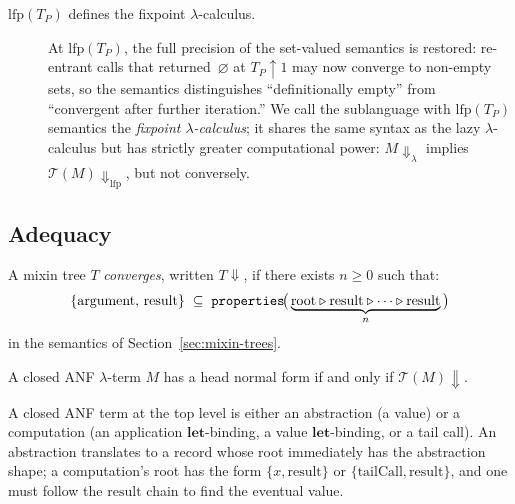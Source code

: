 \begin{remark}
  \begin{description}
    \item[$\mathrm{lfp}(T_P)$ defines the fixpoint
      $\lambda$-calculus.]
      At $\mathrm{lfp}(T_P)$, the full precision of the
      set-valued semantics is restored: re-entrant calls
      that returned~$\varnothing$ at $T_P\!\uparrow\!1$
      may now converge to non-empty sets, so the semantics
      distinguishes ``definitionally empty'' from
      ``convergent after further iteration.''
      We call the sublanguage with $\mathrm{lfp}(T_P)$
      semantics the \emph{fixpoint $\lambda$-calculus};
      it shares the same syntax as the lazy $\lambda$-calculus
      but has strictly greater computational power:
      $M{\Downarrow}_\lambda$ implies
      $\mathcal{T}(M){\Downarrow}_{\mathrm{lfp}}$,
      but not conversely.
  \end{description}
\end{remark}

\subsection{Adequacy}

\begin{definition}\label{def:convergence}
  A mixin tree $T$ \emph{converges}, written $T{\Downarrow}$,
  if there exists $n \ge 0$ such that:
  \[
    \{\mathrm{argument},\, \mathrm{result}\}
    \;\subseteq\;
    \mathtt{properties}\!\bigl(\,
      \underbrace{\text{root} \mathbin{\triangleright} \mathrm{result}
      \mathbin{\triangleright} \cdots \mathbin{\triangleright} \mathrm{result}}_{n}
    \,\bigr)
  \]
  in the semantics of
  Section~\ref{sec:mixin-trees}.
\end{definition}

\begin{theorem}[Adequacy]\label{thm:adequacy}
  A closed ANF $\lambda$-term $M$ has a head normal form if and
  only if $\mathcal{T}(M){\Downarrow}$.
\end{theorem}

A closed ANF term at the top level is either an abstraction
(a value) or a computation (an application
  $\mathbf{let}$-binding, a value $\mathbf{let}$-binding,
or a tail call).
An abstraction translates to a record whose root immediately
has the abstraction shape; a computation's root has the form
$\{x, \mathrm{result}\}$ or
$\{\mathrm{tailCall}, \mathrm{result}\}$, and one must follow
the $\mathrm{result}$ chain to find the eventual value.

